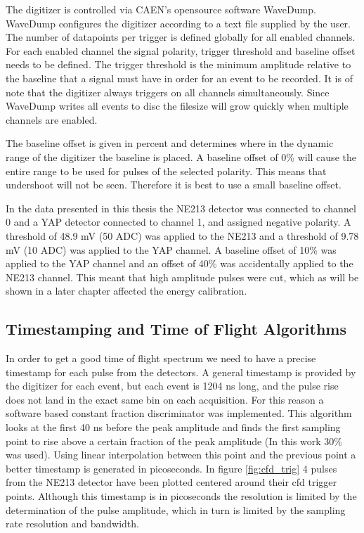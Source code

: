 \documentclass[main.tex]{subfiles}
\begin{document}
The digitizer is controlled via CAEN's opensource software WaveDump\cite{WaveDump}. WaveDump configures the digitizer according to a text file supplied by the user. The number of datapoints per trigger is defined globally for all enabled channels. 
For each enabled channel the signal polarity, trigger threshold and baseline offset needs to be defined. The trigger threshold is the minimum amplitude relative to the baseline that a signal must have in order for an event to be recorded. It is of note that the digitizer always triggers on all channels simultaneously. Since WaveDump writes all events to disc the filesize will grow quickly when multiple channels are enabled. 

The baseline offset is given in percent and determines where in the dynamic range of the digitizer the baseline is placed. A baseline offset of 0\% will cause the entire range to be used for pulses of the selected polarity. This means that undershoot will not be seen. Therefore it is best to use a small baseline offset.

In the data presented in this thesis the NE213 detector was connected to channel 0 and a YAP detector connected to channel 1, and assigned negative polarity. A threshold of 48.9 mV (50 ADC) was applied to the NE213 and a threshold of 9.78 mV (10 ADC) was applied to the YAP channel. A baseline offset of 10\% was applied to the YAP channel and an offset of 40\% was accidentally applied to the NE213 channel. This meant that high amplitude pulses were cut, which as will be shown in a later chapter affected the energy calibration.



\subsection{Timestamping and Time of Flight Algorithms}
In order to get a good time of flight spectrum we need to have a precise timestamp for each pulse from the detectors. A general timestamp is provided by the digitizer for each event, but each event is 1204 ns long, and the pulse rise does not land in the exact same bin on each acquisition. For this reason a software based constant fraction discriminator was implemented. This algorithm looks at the first 40 ns before the peak amplitude and finds the first sampling point to rise above  a certain fraction of the peak amplitude (In this work 30\% was used). Using linear interpolation between this point and the previous point a better timestamp is generated in picoseconds. In figure \ref{fig:cfd_trig} 4 pulses from the NE213 detector have been plotted centered around their cfd trigger points. Although this timestamp is in picoseconds the resolution is limited by the determination of the pulse amplitude, which in turn is limited by the sampling rate resolution and bandwidth. 
\end{document}
